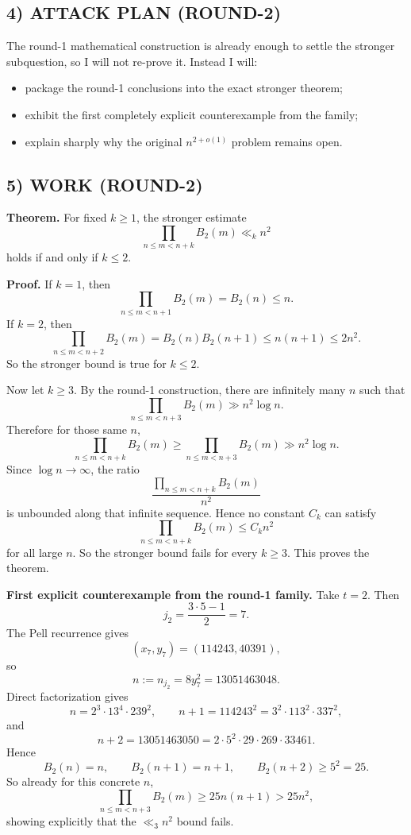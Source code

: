 \subsection*{4) ATTACK PLAN (ROUND-2)}
The round-1 mathematical construction is already enough to settle the stronger subquestion, so I will not re-prove it. Instead I will:
\begin{itemize}
\item package the round-1 conclusions into the exact stronger theorem;
\item exhibit the first completely explicit counterexample from the family;
\item explain sharply why the original $n^{2+o(1)}$ problem remains open.
\end{itemize}

\subsection*{5) WORK (ROUND-2)}
\textbf{Theorem.} For fixed $k\ge 1$, the stronger estimate
\[
\prod_{n\le m<n+k} B_2(m) \ll_k n^2
\]
holds if and only if $k\le 2$.

\medskip
\textbf{Proof.}
If $k=1$, then
\[
\prod_{n\le m<n+1} B_2(m)=B_2(n)\le n.
\]
If $k=2$, then
\[
\prod_{n\le m<n+2} B_2(m)=B_2(n)B_2(n+1)\le n(n+1)\le 2n^2.
\]
So the stronger bound is true for $k\le 2$.

Now let $k\ge 3$. By the round-1 construction, there are infinitely many $n$ such that
\[
\prod_{n\le m<n+3} B_2(m) \gg n^2\log n.
\]
Therefore for those same $n$,
\[
\prod_{n\le m<n+k} B_2(m)
\ge
\prod_{n\le m<n+3} B_2(m)
\gg n^2\log n.
\]
Since $\log n\to\infty$, the ratio
\[
\frac{\prod_{n\le m<n+k} B_2(m)}{n^2}
\]
is unbounded along that infinite sequence. Hence no constant $C_k$ can satisfy
\[
\prod_{n\le m<n+k} B_2(m)\le C_k n^2
\]
for all large $n$. So the stronger bound fails for every $k\ge 3$.
This proves the theorem.

\medskip
\textbf{First explicit counterexample from the round-1 family.}
Take $t=2$. Then
\[
j_2=\frac{3\cdot 5-1}{2}=7.
\]
The Pell recurrence gives
\[
(x_7,y_7)=(114243,40391),
\]
so
\[
n:=n_{j_2}=8y_7^2=13051463048.
\]
Direct factorization gives
\[
n=2^3\cdot 13^4\cdot 239^2,
\qquad
n+1=114243^2=3^2\cdot 113^2\cdot 337^2,
\]
and
\[
n+2=13051463050=2\cdot 5^2\cdot 29\cdot 269\cdot 33461.
\]
Hence
\[
B_2(n)=n,
\qquad
B_2(n+1)=n+1,
\qquad
B_2(n+2)\ge 5^2=25.
\]
So already for this concrete $n$,
\[
\prod_{n\le m<n+3} B_2(m) \ge 25n(n+1) > 25n^2,
\]
showing explicitly that the $\ll_3 n^2$ bound fails.

